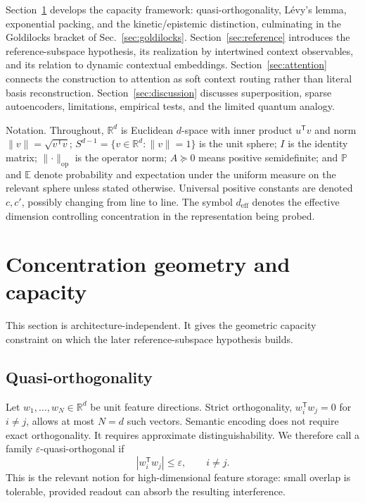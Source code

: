 \documentclass[
  aps,
  reprint,
  superscriptaddress,
  floatfix,
  nofootinbib,
  longbibliography
]{revtex4-2}
\newcommand{\R}{\mathbb{R}}
\newcommand{\E}{\mathbb{E}}
\newcommand{\Prob}{\mathbb{P}}
\newcommand{\Sph}[1]{S^{#1}}
\newcommand{\deff}{d_{\mathrm{eff}}}
\newcommand{\T}{^{\mathsf{T}}}
\newcommand{\opnorm}[1]{\lVert #1 \rVert_{\mathrm{op}}}
\newcommand{\norm}[1]{\lVert #1 \rVert}
\begin{document}
Section~\ref{sec:concentration} develops the capacity framework:
quasi-orthogonality, L\'evy's lemma, exponential packing, and the
kinetic/epistemic distinction, culminating in the Goldilocks bracket of
Sec.~\ref{sec:goldilocks}. Section~\ref{sec:reference} introduces the
reference-subspace hypothesis, its realization by intertwined context
observables, and its relation to dynamic contextual embeddings.
Section~\ref{sec:attention} connects the construction to attention as soft
context routing rather than literal basis reconstruction.
Section~\ref{sec:discussion} discusses superposition, sparse
autoencoders, limitations, empirical tests, and the limited quantum
analogy.

{Notation.}
Throughout, $\R^{d}$ is Euclidean $d$-space with inner product $u\T v$
and norm $\norm{v}=\sqrt{v\T v}$; $\Sph{d-1}=\{v\in\R^{d}:\norm{v}=1\}$
is the unit sphere; $I$ is the identity matrix; $\opnorm{\cdot}$ is the
operator norm; $A\succeq0$ means positive semidefinite; and $\Prob$ and
$\E$ denote probability and expectation under the uniform measure on
the relevant sphere unless stated otherwise. Universal positive
constants are denoted $c,c'$, possibly changing from line to line.
The symbol $\deff$ denotes the effective dimension controlling
concentration in the representation being probed.

\section{Concentration geometry and capacity}
\label{sec:concentration}

This section is architecture-independent. It gives the geometric
capacity constraint on which the later reference-subspace hypothesis builds.

\subsection{Quasi-orthogonality}
\label{sec:quasiortho}

Let $w_{1},\dots,w_{N}\in\R^{d}$ be unit feature directions. Strict orthogonality,
$w_i\T w_j=0$ for $i\neq j$, allows at most $N=d$ such vectors. Semantic
encoding does not require exact orthogonality. It requires approximate
distinguishability. We therefore call a family
$\varepsilon$-quasi-orthogonal if
%
\begin{equation}
\label{eq:quasiortho}
|w_i\T w_j|\le \varepsilon,\qquad i\neq j .
\end{equation}
%
This is the relevant notion for high-dimensional feature storage:
small overlap is tolerable, provided readout can absorb the resulting
interference.
\end{document}
